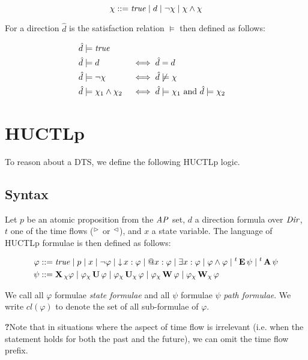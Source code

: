 \[
	\chi ::= \mathit{true} \mid d \mid \neg\chi \mid \chi\wedge\chi
\]

For a direction $\hat d$ is the satisfaction relation $\models$ then defined as follows:

\begin{alignat*}{4}
	\hat d &\models \mathit{true} \\
	\hat d &\models d 								&&\iff \hat d = d \\
	\hat d &\models \neg\chi 					 &&\iff \hat d\not\models\chi \\
	\hat d &\models \chi_1 \land \chi_2 	 &&\iff \hat d\models\chi_1 \text{ and } \hat d\models\chi_2
\end{alignat*}

\section{\Acl{HUCTLp}}

To reason about a \ac{DTS}, we define the following \ac{HUCTLp} logic.

\subsection{Syntax}

Let $p$ be an atomic proposition from the $\mathit{AP}$ set, $d$ a direction formula over $\mathit{Dir}$,  $t$ one of the time flows (${}^\vartriangleright{}$ or ${}^\vartriangleleft{}$), and $x$ a state variable. The language of \ac{HUCTLp} formulae is then defined as follows:

\begin{align*}
	\varphi 	&::= 	\mathit{true} 
	\mid p 
	\mid x 
	\mid  \neg \varphi 
	\mid \operatorname{\downarrow} x : \varphi 
	\mid \operatorname{@\!} x : \varphi 
	\mid \exists x : \varphi 
	\mid \varphi \land \varphi 
	\mid {}^{t}\operatorname{\mathbf{E}} \psi 
	\mid {}^{t}\operatorname{\mathbf{A}} \psi 
	\\
	\psi 		  &::= 	  
	\operatorname{\mathbf{X}}{}_{\chi} \varphi \mid
	\varphi {}_{\chi}\operatorname{\mathbf{U}} \varphi \mid
	\varphi {}_{\chi}\operatorname{\mathbf{U}}_{\chi} \varphi \mid
	\varphi {}_{\chi}\operatorname{\mathbf{W}} \varphi \mid
	\varphi {}_{\chi}\operatorname{\mathbf{W}}_{\chi} \varphi
	\\
\end{align*}

We call all $\varphi$ formulae \emph{state formulae} and all $\psi$ formulae $\psi$ \emph{path formulae}. We write $cl(\varphi)$ to denote the set of all sub-formulae of $\varphi$.

\textbf{?}Note that in situations where the aspect of time flow is irrelevant (i.e. when the statement holds for both the past and the future), we can omit the time flow prefix.

